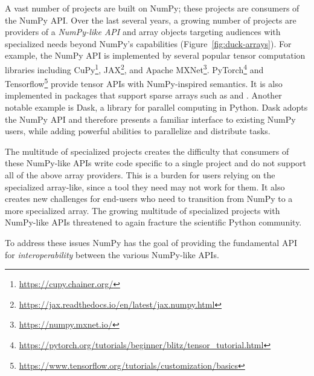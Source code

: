 A vast number of projects are built on NumPy;
these projects are consumers of the NumPy API.
Over the last several years, a growing number of projects are providers of
a \emph{NumPy-like API} and array objects targeting audiences with specialized
needs beyond NumPy's capabilities (Figure~\ref{fig:duck-arrays}).
For example, the NumPy API is implemented by several popular tensor computation
libraries including CuPy\footnote{\url{https://cupy.chainer.org/}},
JAX\footnote{\url{https://jax.readthedocs.io/en/latest/jax.numpy.html}},
and Apache MXNet\footnote{\url{https://numpy.mxnet.io/}}.
PyTorch\footnote{\url{https://pytorch.org/tutorials/beginner/blitz/tensor\_tutorial.html}}
and Tensorflow\footnote{\url{https://www.tensorflow.org/tutorials/customization/basics}}
provide tensor APIs with NumPy-inspired semantics.
It is also implemented in packages that support sparse arrays
such as  and .
Another notable example is Dask, a library for parallel computing in
Python.  Dask adopts the NumPy API and therefore presents a familiar
interface to existing NumPy users, while adding powerful abilities to
parallelize and distribute tasks.


The multitude of specialized projects creates the difficulty that consumers
of these NumPy-like APIs write code specific to a single project and do not support
all of the above array providers.
This is a burden for users relying on the specialized array-like, since
a tool they need may not work for them.
It also creates new challenges for end-users who need to transition
from NumPy to a more specialized array.
The growing multitude of specialized projects with NumPy-like APIs threatened
to again fracture the scientific Python community.


To address these issues NumPy has the goal of providing the fundamental
API for \emph{interoperability} between the various NumPy-like APIs.

